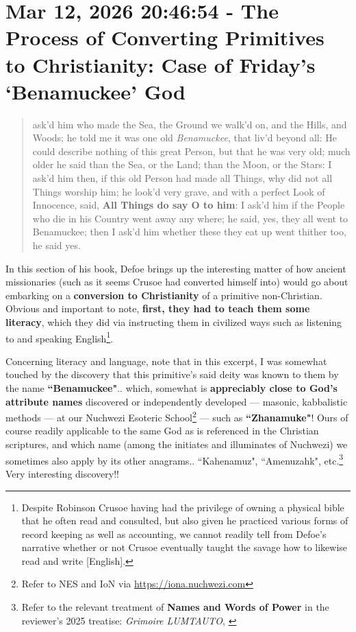 \documentclass[a4paper]{article}
\begin{document}
\section{Mar 12, 2026 20:46:54 - The Process of Converting Primitives to Christianity: Case of Friday's `Benamuckee' God}
\label{SEC56}


\noindent
\begin{minipage}{1\textwidth}
\vspace{1em}
\begin{quotation}
{\ttfamily


ask’d him who made the Sea, the Ground we walk’d on, and the Hills, and Woods; he told me it was one old \textit{Benamuckee}, that liv’d beyond all: He could describe nothing of this great Person, but that he was very old; much older he said than the Sea, or the Land; than the Moon, or the Stars: I ask’d him then, if this old Person had made all Things, why did not all Things worship him; he look’d very grave, and with a perfect Look of Innocence, said, \textbf{All Things do say O to him}: I ask’d him if the People who die in his Country went away any where; he said, yes, they all went to Benamuckee; then I ask’d him whether these they eat up went thither too, he said yes.


}
\end{quotation}
\vspace{1em}
\end{minipage}



In this section of his book, Defoe brings up the interesting matter of how ancient missionaries (such as it seems Crusoe had converted himself into) would go about embarking on a \textbf{conversion to Christianity} of a primitive non-Christian. Obvious and important to note, \textbf{first, they had to teach them some literacy}, which they did via instructing them in civilized ways such as listening to and speaking English\footnote{Despite Robinson Crusoe having had the privilege of owning a physical bible that he often read and consulted, but also given he practiced various forms of record keeping as well as accounting, we cannot readily tell from Defoe's narrative whether or not Crusoe eventually taught the savage how to likewise read and write [English].}. 

Concerning literacy and language, note that in this excerpt, I was somewhat touched by the discovery that this primitive's said deity was known to them by the name \textbf{``Benamuckee"}.. which, somewhat is \textbf{appreciably close to God's attribute names} discovered or independently developed --- masonic, kabbalistic methods --- at our Nuchwezi Esoteric School\footnote{Refer to NES and IoN via \url{https://iona.nuchwezi.com}} --- such as \textbf{``Zhanamuke"}! Ours of course readily applicable to the same God as is referenced in the Christian scriptures, and which name (among the initiates and illuminates of Nuchwezi) we sometimes also apply by its other anagrams.. ``Kahenamuz", ``Amenuzahk", etc.\footnote{Refer to the relevant treatment of \textbf{Names and Words of Power} in the reviewer's 2025 treatise: \textit{Grimoire LUMTAUTO}, \cite{lutalo_2025_grimlumtauto}} Very interesting discovery!! 
\end{document}
